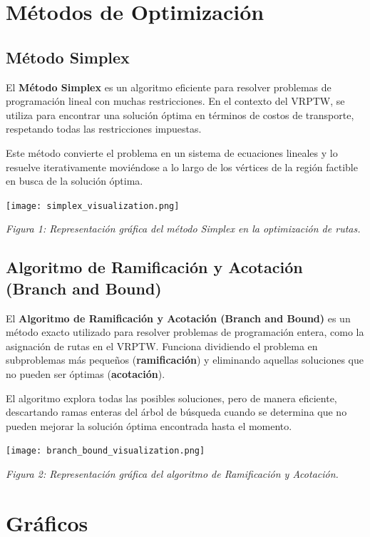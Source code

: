 \documentclass{article}
\begin{document}
\section{Métodos de Optimización}

\subsection{Método Simplex}
El \textbf{Método Simplex} es un algoritmo eficiente para resolver problemas de programación lineal con muchas restricciones. En el contexto del VRPTW, se utiliza para encontrar una solución óptima en términos de costos de transporte, respetando todas las restricciones impuestas.

Este método convierte el problema en un sistema de ecuaciones lineales y lo resuelve iterativamente moviéndose a lo largo de los vértices de la región factible en busca de la solución óptima.

\begin{center}
    \texttt{[image: simplex\_visualization.png]}
\end{center}
\textit{Figura 1: Representación gráfica del método Simplex en la optimización de rutas.}

\subsection{Algoritmo de Ramificación y Acotación (Branch and Bound)}
El \textbf{Algoritmo de Ramificación y Acotación (Branch and Bound)} es un método exacto utilizado para resolver problemas de programación entera, como la asignación de rutas en el VRPTW. Funciona dividiendo el problema en subproblemas más pequeños (\textbf{ramificación}) y eliminando aquellas soluciones que no pueden ser óptimas (\textbf{acotación}).

El algoritmo explora todas las posibles soluciones, pero de manera eficiente, descartando ramas enteras del árbol de búsqueda cuando se determina que no pueden mejorar la solución óptima encontrada hasta el momento.

\begin{center}
    \texttt{[image: branch\_bound\_visualization.png]}
\end{center}
\textit{Figura 2: Representación gráfica del algoritmo de Ramificación y Acotación.}

\section{Gráficos}
\end{document}
